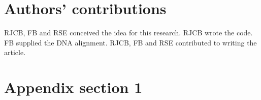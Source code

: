 \documentclass{article}
\begin{document}
\section{Authors' contributions}

RJCB, FB and RSE conceived the idea for this research. 
RJCB wrote the code.
FB supplied the DNA alignment.
RJCB, FB and RSE contributed to writing the article.




\appendix

\section{Appendix section 1}
\end{document}

